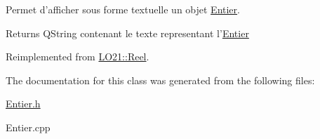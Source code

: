 \-Permet d'afficher sous forme textuelle un objet \hyperlink{class_l_o21_1_1_entier}{\-Entier}. 

\begin{DoxyReturn}{\-Returns}
\-Q\-String contenant le texte representant l'\hyperlink{class_l_o21_1_1_entier}{\-Entier} 
\end{DoxyReturn}


\-Reimplemented from \hyperlink{class_l_o21_1_1_reel_a3a9ad40b48c0fe365d69d023b026b34c}{\-L\-O21\-::\-Reel}.



\-The documentation for this class was generated from the following files\-:\begin{DoxyCompactItemize}
\item 
\hyperlink{_entier_8h}{\-Entier.\-h}\item 
\-Entier.\-cpp\end{DoxyCompactItemize}
